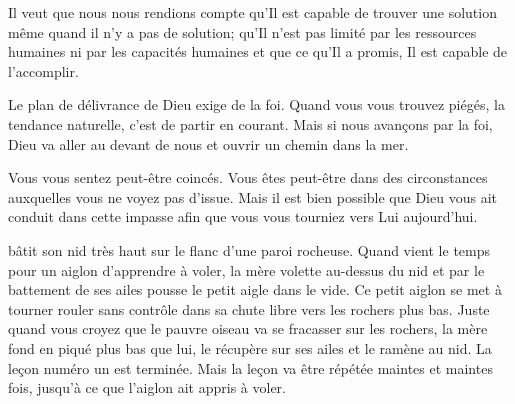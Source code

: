 Il veut que nous nous rendions compte qu'Il est capable de trouver une solution
 même quand il n'y a pas de solution;
 qu'Il n'est pas limité par les ressources humaines
 ni par les capacités humaines et que ce qu'Il a promis,
 Il est capable de l'accomplir.

Le plan de délivrance de Dieu exige de la foi.
 Quand vous vous trouvez piégés, la tendance naturelle,
 c'est de partir en courant.
 Mais si nous avançons par la foi,
 Dieu va aller au devant de nous et ouvrir un chemin dans la mer.

Vous vous sentez peut-être coincés.
 Vous êtes peut-être dans des circonstances
 auxquelles vous ne voyez pas d'issue.
 Mais il est bien possible que Dieu vous ait conduit dans cette impasse
 afin que vous vous tourniez vers Lui aujourd'hui. 

\dvrule






 bâtit son nid très haut
 sur le flanc d'une paroi rocheuse.
 Quand vient le temps pour un aiglon d'apprendre à voler,
 la mère volette au-dessus du nid et par le battement de ses ailes
 pousse le petit aigle dans le vide.
 Ce petit aiglon se met à tourner rouler sans contrôle
 dans sa chute libre vers les rochers plus bas.
 Juste quand vous croyez que le pauvre oiseau va se fracasser sur les rochers,
 la mère fond en piqué plus bas que lui, le récupère sur ses ailes
 et le ramène au nid.
 La leçon numéro un est terminée.
 Mais la leçon va être répétée maintes et maintes fois,
 jusqu'à ce que l'aiglon ait appris à voler.

